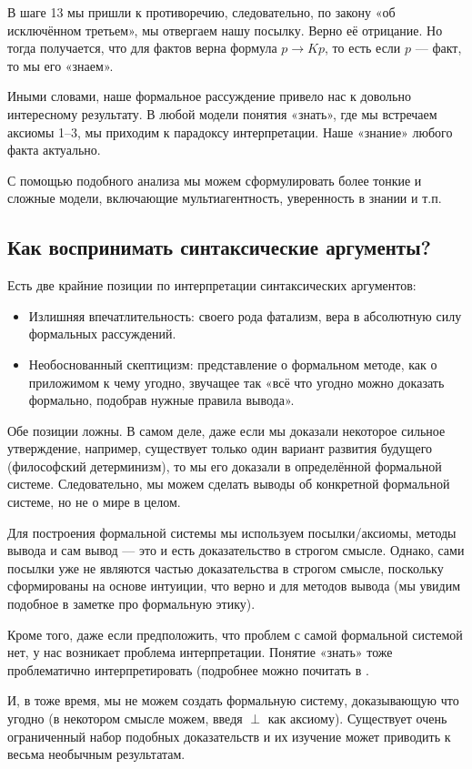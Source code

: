 \documentclass[openany]{book}
\theoremstyle{plain}
\theoremstyle{definition}
\begin{document}
В шаге 13 мы пришли к противоречию, следовательно, по закону «об исключённом третьем», мы отвергаем нашу посылку. Верно её отрицание. Но тогда получается, что для фактов верна формула \(p \to Kp\), то есть если \(p\) --- факт, то мы его «знаем».

Иными словами, наше формальное рассуждение привело нас к довольно интересному результату. В любой модели понятия «знать», где мы встречаем аксиомы 1–3, мы приходим к парадоксу интерпретации. Наше «знание» любого факта актуально.

С помощью подобного анализа мы можем сформулировать более тонкие и сложные модели, включающие мультиагентность, уверенность в знании и т.п.

\subsection{ Как воспринимать синтаксические аргументы? }

Есть две крайние позиции по интерпретации синтаксических аргументов:\
\begin{itemize}
\item Излишняя впечатлительность:
своего рода фатализм, вера в абсолютную силу формальных рассуждений.
\item Необоснованный скептицизм:
представление о формальном методе, как о приложимом к чему угодно, звучащее так «всё что угодно можно доказать формально, подобрав нужные правила вывода».
\end{itemize}

Обе позиции ложны. В самом деле, даже если мы доказали некоторое сильное утверждение, например, существует только один вариант развития будущего (философский детерминизм), то мы его доказали в определённой формальной системе. Следовательно, мы можем сделать выводы об конкретной формальной системе, но не о мире в целом.

Для построения формальной системы мы используем посылки/аксиомы, методы вывода и сам вывод — это и есть доказательство в строгом смысле. Однако, сами посылки уже не являются частью доказательства в строгом смысле, поскольку сформированы на основе интуиции, что верно и для методов вывода (мы увидим подобное в заметке про формальную этику).

Кроме того, даже если предположить, что проблем с самой формальной системой нет, у нас возникает проблема интерпретации. Понятие «знать» тоже проблематично интерпретировать (подробнее можно почитать в \cite{Lewis}.

И, в тоже время, мы не можем создать формальную систему, доказывающую что угодно (в некотором смысле можем, введя \(\perp\) как аксиому). Существует очень ограниченный набор подобных доказательств и их изучение может приводить к весьма необычным результатам.
\end{document}
